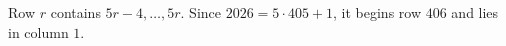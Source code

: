 Row $r$ contains $5r-4,\ldots,5r$. Since $2026=5\cdot405+1$, it begins row $406$ and lies in $\boxed{\text{column }1}$.

